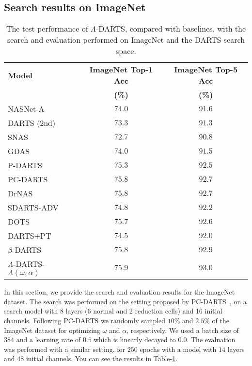 \documentclass{article} \usepackage{fancyhdr, iclr2023_conference, times}
\newcommand{\mydarts}{$\Lambda$-DARTS\xspace}
\begin{document}
\subsection{Search results on ImageNet}
\label{appndx:imagenet-search}
\begin{table}[t]
\centering
\caption{The test performance of \mydarts, compared with baselines, with the search and evaluation performed on ImageNet and the DARTS search space.} 
\label{table:imagenet-search}
\begin{tabular}{l|c|c}
\textbf{Model} &\textbf{ImageNet Top-1 Acc} & \textbf{ImageNet Top-5 Acc} \\ 
& \textbf{(\%)} & \textbf{(\%)} \\\hline
NASNet-A~\citep{DBLP:conf/cvpr/ZophVSL18} &	$74.0$ &	$91.6$\\
DARTS (2nd)~\citep{DBLP:conf/iclr/LiuSY19}	& $73.3$ &	$91.3$\\
SNAS~\citep{DBLP:conf/iclr/XieZLL19} &	$72.7$ &	$90.8$ \\
GDAS~\citep{DBLP:conf/cvpr/DongY19} &	$74.0$ &	$91.5$ \\
P-DARTS~\citep{DBLP:journals/ijcv/ChenXWT21} &	$75.3$ &	$92.5$ \\
PC-DARTS~\citep{DBLP:conf/iclr/XuX0CQ0X20} &	$75.8$ &	$92.7$ \\
DrNAS~\citep{DBLP:conf/iclr/ChenWCTH21} &	$75.8$ &	$92.7$\\
SDARTS-ADV~\citep{DBLP:conf/icml/ChenH20} &	$74.8$ &	$92.2$\\
DOTS~\citep{DBLP:conf/cvpr/GuW0YWLC21} &	$75.7$ &	$92.6$ \\
DARTS+PT~\citep{DBLP:conf/iclr/WangCCTH21} &	$74.5$ &	$92.0$ \\
$\beta$-DARTS~\citep{DBLP:journals/corr/abs-2203-01665} &	$75.8$ &	$92.9$ \\\hline
\mydarts-$\Lambda(\omega, \alpha)$ &	$\mathbf{75.9}$ &	$\mathbf{93.0}$

\end{tabular}
\end{table}
\par In this section, we provide the search and evaluation results for the ImageNet dataset. The search was performed on the setting proposed by PC-DARTS~\citep{DBLP:conf/iclr/XuX0CQ0X20}, on a search model with 8 layers (6 normal and 2 reduction cells) and 16 initial channels. Following PC-DARTS we randomly sampled $10\%$ and $2.5\%$ of the ImageNet dataset for optimizing 
$\omega$ and $\alpha$, respectively. We used a batch size of $384$ and a learning rate of $0.5$ which is linearly decayed to $0.0$. The evaluation was performed with a similar setting, for $250$ epochs with a model with $14$ layers and $48$ initial channels. You can see the results in Table-\ref{table:imagenet-search}.
\end{document}
